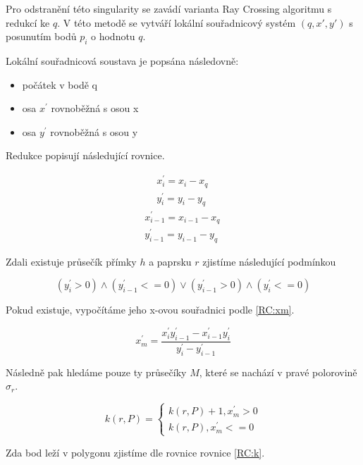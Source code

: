 \documentclass[11pt]{article}
\begin{document}
Pro odstranění této singularity se zavádí varianta Ray Crossing algoritmu s redukcí ke $q$. V této metodě se vytváří lokální souřadnicový systém $(q,x',y')$ s posunutím bodů ${p_{i}}$ o hodnotu $q$. 

Lokální souřadnicová soustava je popsána následovně:
\begin{itemize}
\item počátek v bodě q
\item osa $x^{\prime}$ rovnoběžná s osou x
\item osa $y^{\prime}$ rovnoběžná s osou y
\end{itemize}

Redukce popisují následující rovnice.

\begin{eqnarray}
x_{i}^{\prime}=x_{i}-x_{q}\, \nonumber \\
y_{i}^{\prime}=y_{i}-y_{q} \
\end{eqnarray}
\begin{eqnarray}
x_{i-1}^{\prime}=x_{i-1}-x_{q}\, \nonumber \\
y_{i-1}^{\prime}=y_{i-1}-y_{q} \,
\end{eqnarray}

Zdali existuje průsečík přímky $h$ a paprsku $r$ zjistíme následující podmínkou

\begin{equation}
\left(y_{i}^{\prime}>0\right) \wedge\left(y_{i-1}^{\prime}<=0\right) \vee\left(y_{i-1}^{\prime}>0\right) \wedge\left(y_{i}^{\prime}<=0\right)
\end{equation}

Pokud existuje, vypočítáme jeho x-ovou souřadnici podle \ref{RC:xm}.

\begin{equation}
x_{m}^{\prime}=\frac{x_{i}^{\prime} y_{i-1}^{\prime}-x_{i-1}^{\prime} y_{i}^{\prime}}{y_{i}^{\prime}-y_{i-1}^{\prime}}
\label{RC:xm} 
\end{equation}

Následně pak hledáme pouze ty průsečíky $M$, které se nachází v pravé polorovině $\sigma_{r}$.

\begin{equation}
k(r, P)=\left\{\begin{array}{l}
k(r, P)+1, x_{m}^{\prime}>0 \\ 
k(r, P), x_{m}^{\prime} <= 0
\end{array}\right.
\end{equation}

Zda bod leží v polygonu zjistíme dle rovnice rovnice \ref{RC:k}.
\end{document}

